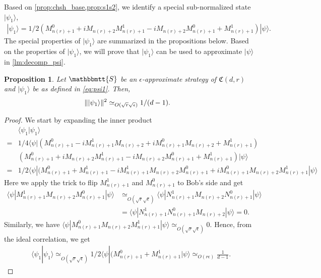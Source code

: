 \documentclass[11pt,letterpaper]{article}
\newcommand{\ket}[1]{|#1\rangle}
\newcommand{\bra}[1]{\langle#1|}
\newcommand{\braket}[2]{\langle#1|#2\rangle}
\DeclarePairedDelimiter{\norm}{\lVert}{\rVert}
\newcommand{\1}{\mathbb{1}}
\newcommand{\nr}{n(r)}
\newcommand{\fC}{\mathfrak{C}}
\newcommand{\bS}{\mathbbmtt{S}}
\newcommand{\ep}{\epsilon}
\newcommand{\se}{\sqrt{\epsilon}}
\newcommand{\qe}{\epsilon^{1/4}}
\newcommand{\sd}{\sqrt{d}}
\newcommand{\sr}{\sqrt{r}}
\newcommand{\appd}[1]{\simeq_{#1}}
\newtheorem{proposition}[theorem]{Proposition}
\theoremstyle{definition}
\begin{document}
Based on \cref{prop:chsh_base,prop:s1s2}, we identify a special sub-normalized state $\ket{\psi_1}$, 
\begin{align}
    \label{eq:psi1}
	\ket{\psi_1} =1/2(M_{\nr+1}^0 + iM_{\nr+2}M_{\nr+1}^1 - iM_{\nr+2}M_{\nr+1}^0 +M_{\nr+1}^1) \ket{\psi}.
\end{align}
The special properties of $\ket{\psi_1}$ are summarized
in the propositions below. 
Based on the properties of $\ket{\psi_1}$, we will prove that $\ket{\psi_1}$ can be used to approximate $\ket{\psi}$
in \cref{lm:decomp_psi}.
\begin{proposition}
    \label{prop:psi1_norm}
	Let $\bS$ be an $\ep$-approximate strategy of $\fC(d,r)$ and $\ket{\psi_1}$ be as defined in
	\cref{eq:psi1}.
	Then, 
	\begin{align}
	 \label{eq:psi1_norm} &\norm{\ket{\psi_1}}^2 \appd{O(\sr\se)} 1/(d-1).
	\end{align}
\end{proposition}
\begin{proof}
	We start by expanding the inner product
	\begin{align*}
		&\braket{\psi_1}{\psi_1} \\
		=&1/4\bra{\psi}(M_{\nr+1}^0 - iM_{\nr+1}^1M_{\nr+2} + iM_{\nr+1}^0M_{\nr+2} +M_{\nr+1}^1)\\
		&(M_{\nr+1}^0 + iM_{\nr+2}M_{\nr+1}^1 -iM_{\nr+2}M_{\nr+1}^0 + M_{\nr+1}^1)\ket{\psi}\\
		=&1/2\bra{\psi}(M_{\nr+1}^0+M_{\nr+1}^1-iM_{\nr+1}^1M_{\nr+2}M_{\nr+1}^0+iM_{\nr+1}^0M_{\nr+2}M_{\nr+1}^1\ket{\psi}
	\end{align*}
	Here we apply the trick to flip $M_{\nr+1}^1$ and $M_{\nr+1}^0$ to Bob's side and get 
	\begin{align*}
		\bra{\psi}M_{\nr+1}^1M_{\nr+2}M_{\nr+1}^0\ket{\psi} 
		&\appd{O(\sr\se)} \bra{\psi}N_{\nr+1}^1M_{\nr+2}N_{\nr+1}^0\ket{\psi} \\
		&= \bra{\psi}N_{\nr+1}^1N_{\nr+1}^0M_{\nr+2}\ket{\psi} = 0.
	\end{align*}
	Similarly, we have $\bra{\psi}M_{\nr+1}^0M_{\nr+2}M_{\nr+1}^1\ket{\psi} \appd{ O(\sr \se)} 0$.
	Hence, from the ideal correlation, we get 
	\begin{align}
		\braket{\psi_1}{\psi_1} \appd{O(\sr\se)} 1/2\bra{\psi}(M_{\nr+1}^0+M_{\nr+1}^1\ket{\psi} \appd{O(r\ep)} 
		 \frac{1}{d-1}.
	\end{align}
\end{proof}
\end{document}
